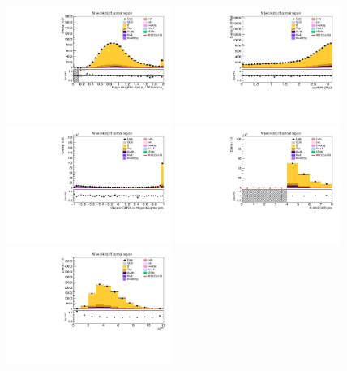 \begin{figure}[tbp]
  \begin{center}
    \includegraphics[width=0.48\textwidth]{figures/wlnhbb2016/resolved/WenWH2TopCR_pTBalanceDijetW.pdf}
    \includegraphics[width=0.48\textwidth]{figures/wlnhbb2016/resolved/WenWH2TopCR_deltaPhiVH.pdf}
    \includegraphics[width=0.48\textwidth]{figures/wlnhbb2016/resolved/WenWH2TopCR_bDiscrMax.pdf}
    \includegraphics[width=0.48\textwidth]{figures/wlnhbb2016/resolved/WenWH2TopCR_nJet.pdf}
    \includegraphics[width=0.48\textwidth]{figures/wlnhbb2016/resolved/WenWH2TopCR_nSoft5.pdf}

\end{center}
\end{figure}
